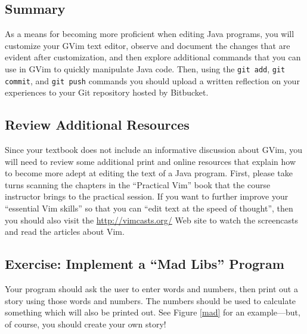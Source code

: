 



\vspace*{-.2in}
\subsection*{Summary}
\vspace*{-.05in}

As a means for becoming more proficient when editing Java programs, you will customize your GVim text editor, observe
and document the changes that are evident after customization, and then explore additional commands that you can use in
GVim to quickly manipulate Java code.  Then, using the {\tt git add}, {\tt git commit}, and {\tt git push} commands you
should upload a written reflection on your experiences to your Git repository hosted by Bitbucket.  

\vspace*{-.15in}
\subsection*{Review Additional Resources}
\vspace*{-.05in}

Since your textbook does not include an informative discussion about GVim, you will need to review some additional print
and online resources that explain how to become more adept at editing the text of a Java program.  First, please take
turns scanning the chapters in the ``Practical Vim'' book that the course instructor brings to the practical session. If
you want to further improve your ``essential Vim skills'' so that you can ``edit text at the speed of thought'', then
you should also visit the \url{http://vimcasts.org/} Web site to watch the screencasts and read the articles about Vim.

\vspace*{-.15in}
\subsection*{Exercise: Implement a ``Mad Libs'' Program} 
\vspace*{-.05in}
Your program should ask the user to enter words and numbers, then print out a story using those words and numbers. The
numbers should be used to calculate something which will also be printed out. See Figure \ref{mad} for an example---but,
of course, you should create your own story!

